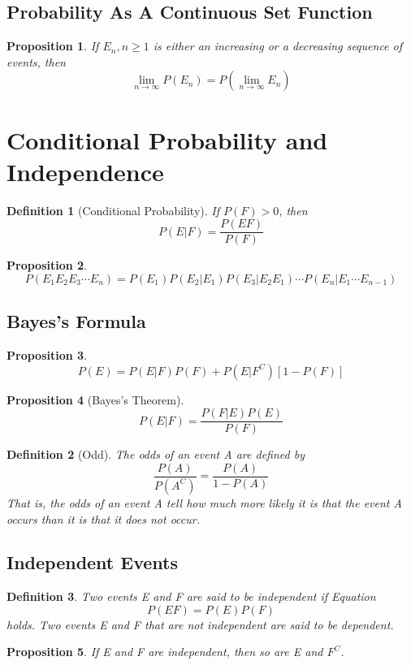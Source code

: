 \documentclass[12pt]{article}
\newtheorem{definition}{Definition}[subsection]
\newtheorem{proposition}{Proposition}[subsection]
\begin{document}
\subsection{Probability As A Continuous Set Function}
    \begin{proposition}
    If ${E_n, n \geq 1}$ is either an increasing or a decreasing sequence of events, then
    \[\lim_{n\rightarrow\infty} P(E_n) = P(\lim_{n\rightarrow\infty}E_n) \]
    \end{proposition}
    \section{Conditional Probability and Independence}
    \begin{definition}[Conditional Probability]
        If $P(F) > 0$, then
        \[P(E|F) = \frac{P(EF)}{P(F)}\]
    \end{definition}
    \begin{proposition}
        \[P(E_1E_2E_3\cdots E_n) = P(E_1)P(E_2 | E_1)P(E_3|E_2E_1)\cdots P(E_n | E_1\cdots E_{n-1})\]
    \end{proposition}
    \subsection{Bayes's Formula}
    \begin{proposition}
        \[P(E) = P(E|F)P(F) + P(E|F^C)[1-P(F)]\]
    \end{proposition}
    \begin{proposition}[Bayes's Theorem]
        \[P(E|F) = \frac{P(F|E)P(E)}{P(F)}\]
    \end{proposition}

    \begin{definition}[Odd]
        The odds of an event A are defined by
        \[\frac{P(A)}{P(A^C)} = \frac{P(A)}{1-P(A)} \]
        That is, the odds of an event A tell how much more likely it is that the event A occurs
than it is that it does not occur. 
    \end{definition}
    \subsection{Independent Events}
    \begin{definition}
        Two events E and F are said to be independent if Equation \[P(EF) = P(E)P(F)\] holds. Two events E and F that are not independent are said to be dependent.
    \end{definition}
    \begin{proposition}
        If E and F are independent, then so are E and $F^C$.
    \end{proposition}
\end{document}
